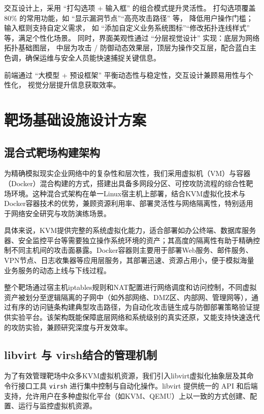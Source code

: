 \documentclass[lang=cn,10pt]{elegantbook}
\begin{document}
交互设计上，采用 “打勾选项 + 输入框” 的组合模式提升灵活性。
打勾选项覆盖 80\% 的常用功能，如 “显示漏洞节点”“高亮攻击路径” 等，
降低用户操作门槛；输入框则支持自定义需求，
如 “添加自定义业务系统图标”“修改拓扑连线样式” 等，满足个性化场景。
同时，界面美观性通过 “分层视觉设计” 实现：底层为网络拓扑基础图层，
中层为攻击 / 防御动态效果层，顶层为操作交互层，配合蓝白主色调，确保运维与安全人员能快速捕捉关键信息。

\begin{definition}
    前端通过 “大模型 + 预设框架” 平衡动态性与稳定性，交互设计兼顾易用性与个性化，
    视觉分层提升信息获取效率。
\end{definition}

\section{靶场基础设施设计方案}

\subsection{混合式靶场构建架构}

为精确模拟现实企业网络中的复杂性和层次性，我们采用虚拟机（VM）与容器（Docker）混合构建的方式，搭建出具备多网段分区、可控攻防流程的综合性靶场环境。这种混合式架构在单一Linux宿主机上部署，结合KVM虚拟化技术与Docker容器技术的优势，兼顾资源利用率、部署灵活性与网络隔离性，特别适用于网络安全研究与攻防演练场景。

具体来说，KVM提供完整的系统虚拟化能力，适合部署如办公终端、数据库服务器、安全监控平台等需要独立操作系统环境的资产；其高度的隔离性有助于精确控制不同主机间的攻击面暴露。Docker容器则主要用于部署Web服务、邮件服务、VPN节点、日志收集器等应用层服务，其部署迅速、资源占用小，便于模拟海量业务服务的动态上线与下线过程。

整个靶场通过宿主机iptables规则和NAT配置进行网络调度和访问控制，不同虚拟资产被划分至逻辑隔离的子网中（如外部网络、DMZ区、内部网、管理网等），通过有序的访问链条构建典型攻击路径，为自动化攻击链生成与防御部署策略验证提供实验平台。该架构既能保障底层网络和系统级别的真实还原，又能支持快速迭代的攻防实验，兼顾研究深度与开发效率。


\subsection{libvirt 与 virsh结合的管理机制}

为了有效管理靶场中众多KVM虚拟机资源，我们引入libvirt虚拟化抽象层及其命令行接口工具 \texttt{virsh} 进行集中控制与自动化操作。libvirt 提供统一的 API 和后端支持，允许用户在多种虚拟化平台（如KVM、QEMU）上以一致的方式创建、配置、运行与监控虚拟机资源。
\end{document}
